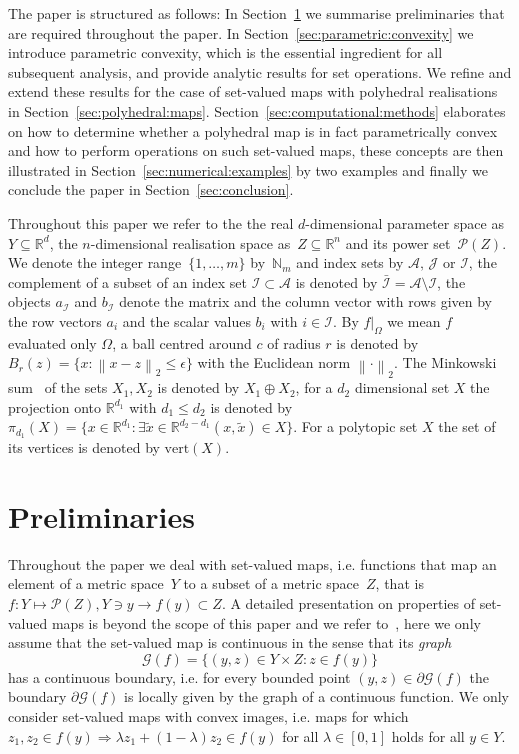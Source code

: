 \documentclass[a4paper, 12pt, twoside]{article}
\theoremstyle{definition}
\numberwithin{equation}{section}
\providecommand{\norm}[1]{\left\|#1\right\|}
\begin{document}
The paper is structured as follows:
%
In Section~\ref{sec:preliminaries} we summarise preliminaries that are
required throughout the paper. In
Section~\ref{sec:parametric:convexity} we introduce parametric
convexity, which is the essential ingredient for all subsequent
analysis, and provide analytic results for set operations. 
We refine and extend these results for the case of set-valued maps with polyhedral realisations in Section~\ref{sec:polyhedral:maps}.
%
Section~\ref{sec:computational:methods} elaborates on how to determine whether a polyhedral map is in fact parametrically convex and how to perform operations on such set-valued maps, these concepts are then illustrated in Section~\ref{sec:numerical:examples} by two examples and finally we conclude the paper in Section~\ref{sec:conclusion}.


Throughout this paper we refer to the the real $d$-dimensional parameter space as $Y\subseteq\mathbb R^d$, the $n$-dimensional realisation space as~$Z\subseteq\mathbb R^n$ and its power set~$\mathscr P(Z)$.
%
We denote the integer range~$\{1,\dots,m\}$ by~$\mathbb N_m$ and index sets by $\mathcal A,\,\mathcal J$ or $\mathcal I$, the complement of a subset of an index set $\mathcal I\subset\mathcal A$ is denoted by $\bar{\mathcal I}=\mathcal A\setminus\mathcal I$, the objects $a_{\mathcal I}$ and $b_{\mathcal I}$ denote the matrix and the column vector with rows given by the row vectors $a_i$ and the scalar values $b_i$ with $i\in\mathcal I$.
%
By $f\vert_\Omega$ we mean $f$ evaluated only $\Omega$, a ball centred around $c$ of radius $r$ is denoted by $B_r(z)=\{x:\norm{x-z}_2\leq\epsilon\}$ with the Euclidean norm $\norm{\cdot}_2$.
%
The Minkowski sum~\cite{Minkowski:1911} of the sets $X_1,X_2$ is denoted by $X_1\oplus X_2$, for a $d_2$ dimensional set $X$ the projection onto $\mathbb R^{d_1}$ with $d_1\leq d_2$ is denoted by $\pi_{d_1}(X) = \{x\in\mathbb R^{d_1}:\exists \tilde x\in\mathbb R^{d_2-d_1} (x,\tilde x)\in X\}$.
%
For a polytopic set $X$ the set of its vertices is denoted by $\text{vert}(X)$.
%
\section{Preliminaries}\label{sec:preliminaries}

Throughout the paper we deal with set-valued maps, i.e. functions that map an element of a metric space~$Y$ to a subset of a metric space~$Z$, that is $f:Y\mapsto\mathscr P(Z), Y\ni y\rightarrow f(y)\subset Z$. 
%
A detailed presentation on properties of set-valued maps is beyond the scope of this paper and we refer to~\cite{Aubin:2009}, here we only assume that the set-valued map is continuous in the sense that its \emph{graph}
%
\begin{equation}
  \mathscr G(f) = \{(y,z)\in Y\times Z: z\in f(y)\}
\end{equation}
%
has a continuous boundary, i.e. for every bounded point $(y,z)\in\partial\mathscr G(f)$ the boundary $\partial\mathscr G(f)$ is locally given by the graph of a continuous function.
%
We only consider set-valued maps with convex images, i.e. maps for which $z_1,z_2\in f(y)\Rightarrow \lambda z_1+(1-\lambda)z_2\in f(y)$ for all $\lambda\in[0,1]$ holds for all $y\in Y$.
\end{document}
